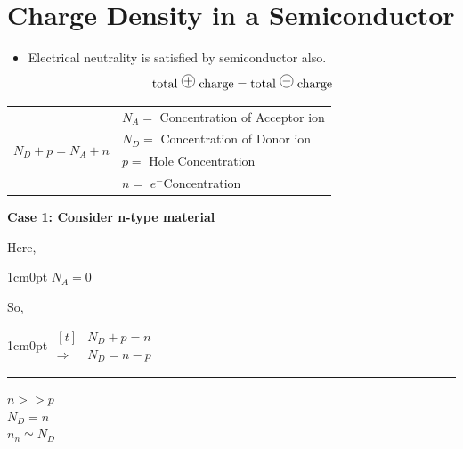\documentclass[a4aper,12pt]{report}
\begin{document}
\section{Charge Density in a Semiconductor}
\begin{itemize}
    \item Electrical neutrality is satisfied by semiconductor also. $$\text{total \begin{tikzpicture}
        \node[draw, circle, inner sep=0pt] (ion) at (0,0) {$+$};
    \end{tikzpicture} charge} = \text{total \begin{tikzpicture}
        \node[draw, circle, inner sep=0pt] (ion) at (0,0) {$-$};
    \end{tikzpicture} charge} $$ 
\end{itemize}
\begin{center}
    \begin{tabular}{c|l}
    \multirow{4}{*}{$N_D + p = N_A + n$}\quad  & \quad $N_A = $ Concentration of Acceptor ion \\
    & \quad $N_D = $ Concentration of Donor ion \\ 
    & \quad $p = $ Hole Concentration \\
    & \quad $n = $ $e^-$Concentration \\  
\end{tabular}
\end{center}
\textbf{Case 1: Consider n-type material} 
\begin{center}\hspace*{2cm}
    \begin{minipage}{0.3\linewidth}
        Here, 
        \begin{adjustwidth}{1cm}{0pt}
            $N_A = 0$
        \end{adjustwidth}
        So, 
        \begin{adjustwidth}{1cm}{0pt}
            \hspace*{-0.5cm}
            $\begin{aligned}[t]
                & N_D + p = n \\
                \Rightarrow &N_D = n - p
            \end{aligned}$
        \end{adjustwidth}
    \end{minipage}
    \begin{minipage}{0.1\linewidth}
        \rule{1pt}{3cm}
    \end{minipage}
    \begin{minipage}{0.3\linewidth}
        $n >> p$ \\ [5pt]
        $N_D = n$ \\ [5pt]
        $n_n \simeq N_D$
    \end{minipage}
\end{center}
\end{document}
